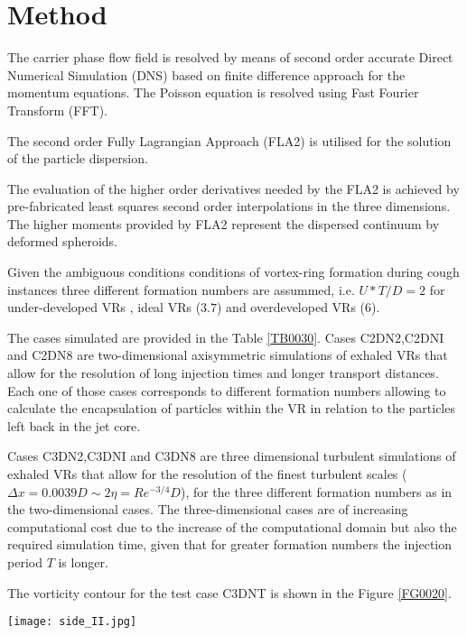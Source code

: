 \documentclass[%
 aip,
 amsmath,amssymb,
 reprint,%
]{revtex4-1}
\begin{document}
\section{\label{sec:Intro}Method}




The carrier phase flow field is resolved by means of second order accurate Direct Numerical Simulation (DNS) based on finite difference approach for the momentum equations. The Poisson equation is resolved using Fast Fourier Transform (FFT). 

The second order Fully Lagrangian Approach (FLA2) is utilised for the solution of the particle dispersion. 

The evaluation of the higher order derivatives needed by the FLA2 is achieved by pre-fabricated least squares second order interpolations in the three dimensions. The higher moments provided by FLA2 represent the dispersed continuum by deformed spheroids. 

Given the ambiguous conditions conditions of vortex-ring formation during cough instances three different formation numbers are assummed, i.e. $U*T/D=2$ for under-developed VRs , ideal VRs ($3.7$)  and overdeveloped VRs ($6$).

The cases simulated are provided in the Table \ref{TB0030}. Cases C2DN2,C2DNI and C2DN8 are two-dimensional axisymmetric simulations of exhaled VRs that allow for the resolution of long injection times and longer transport distances. Each one of those cases corresponds to different formation numbers allowing to calculate the encapsulation of particles within the VR in relation to the particles left back in the jet core.

Cases C3DN2,C3DNI and C3DN8 are
 three dimensional turbulent simulations of exhaled VRs that allow for the resolution of the finest turbulent scales ($\Delta x = 0.0039D\sim 2 \eta = Re^{-3/4}D$), for the three different formation numbers as in the two-dimensional cases. The three-dimensional cases are of increasing computational cost due to the increase of the computational domain but also the required simulation time, given that for greater formation numbers the injection period $T$ is longer.

The vorticity contour for the test case C3DNT is shown in the Figure \ref{FG0020}.

\begin{figure*}
	\texttt{[image: side\_II.jpg]}%
\caption{\label{FG0020} Vorticity contour for the test case C3DNTU.}
\end{figure*}
\end{document}

